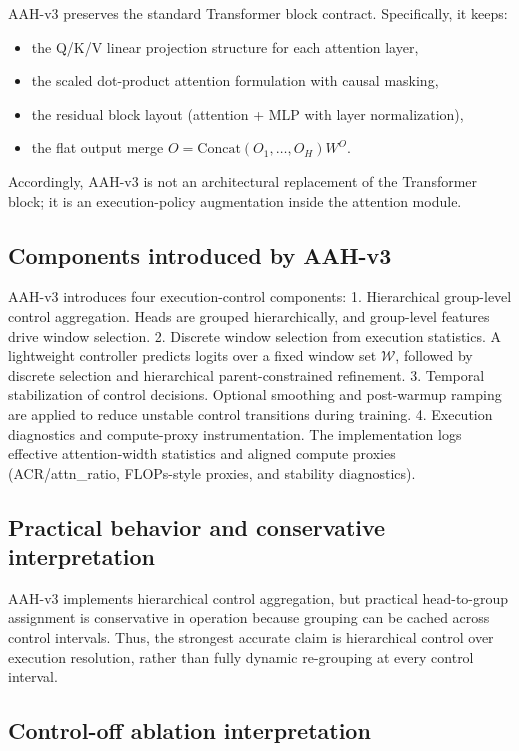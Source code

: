 \documentclass[11pt]{article}
\begin{document}
AAH-v3 preserves the standard Transformer block contract. Specifically, it keeps:
\begin{itemize}
\item the Q/K/V linear projection structure for each attention layer,
\item the scaled dot-product attention formulation with causal masking,
\item the residual block layout (attention + MLP with layer normalization),
\item the flat output merge $O=\mathrm{Concat}(O_1,\dots,O_H)W^O$.
\end{itemize}

Accordingly, AAH-v3 is not an architectural replacement of the Transformer block; it is an execution-policy augmentation inside the attention module.

\subsection{Components introduced by AAH-v3}

AAH-v3 introduces four execution-control components:
	1.	Hierarchical group-level control aggregation.
Heads are grouped hierarchically, and group-level features drive window selection.
	2.	Discrete window selection from execution statistics.
A lightweight controller predicts logits over a fixed window set $\mathcal W$, followed by discrete selection and hierarchical parent-constrained refinement.
	3.	Temporal stabilization of control decisions.
Optional smoothing and post-warmup ramping are applied to reduce unstable control transitions during training.
	4.	Execution diagnostics and compute-proxy instrumentation.
The implementation logs effective attention-width statistics and aligned compute proxies (ACR/attn_ratio, FLOPs-style proxies, and stability diagnostics).

\subsection{Practical behavior and conservative interpretation}

AAH-v3 implements hierarchical control aggregation, but practical head-to-group assignment is conservative in operation because grouping can be cached across control intervals. Thus, the strongest accurate claim is hierarchical control over execution resolution, rather than fully dynamic re-grouping at every control interval.

\subsection{Control-off ablation interpretation}
\end{document}
